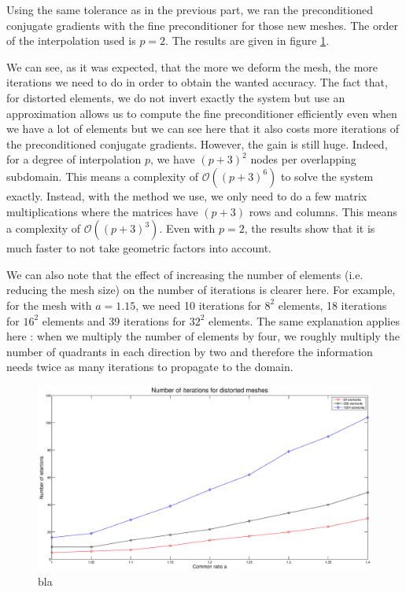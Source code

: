 Using the same tolerance as in the previous part, we ran the preconditioned conjugate gradients with the fine preconditioner for those new meshes. The order of the interpolation used is $p=2$. The results are given in figure \ref{fine_dist_iter}.

We can see, as it was expected, that the more we deform the mesh, the more iterations we need to do in order to obtain the wanted accuracy. The fact that, for distorted elements, we do not invert exactly the system but use an approximation allows us to compute the fine preconditioner efficiently even when we have a lot of elements but we can see here that it also costs more iterations of the preconditioned conjugate gradients. However, the gain is still huge. Indeed, for a degree of interpolation $p$, we have $(p+3)^2$ nodes per overlapping subdomain. This means a complexity of $\mathcal{O}((p+3)^6)$ to solve the system exactly. Instead, with the method we use, we only need to do a few matrix multiplications where the matrices have $(p+3)$ rows and columns. This means a complexity of $\mathcal{O}((p+3)^3)$. Even with $p=2$, the results show that it is much faster to not take geometric factors into account. 

We can also note that the effect of increasing the number of elements (i.e. reducing the mesh size) on the number of iterations is clearer here. For example, for the mesh with $a = 1.15$, we need 10 iterations for $8^2$ elements, 18 iterations for $16^2$ elements and 39 iterations for $32^2$ elements. The same explanation applies here : when we multiply the number of elements by four, we roughly multiply the number of quadrants in each direction by two and therefore the information needs twice as many iterations to propagate to the domain. 

\begin{figure}
\centering
\includegraphics[scale=0.35]{Results/fine_dist_iter.eps}
\caption{bla}
\label{fine_dist_iter}
\end{figure}



